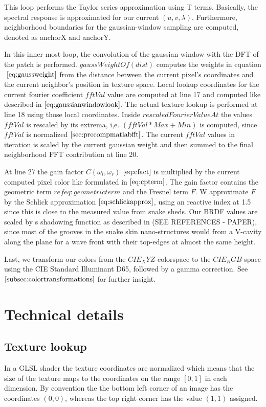 This loop performs the Taylor series approximation using T terms. Basically, the spectral response is approximated for our current $(u,v,\lambda)$. Furthermore, neighborhood boundaries for the gaussian-window sampling are computed, denoted as anchorX and anchorY.

In this inner most loop, the convolution of the gaussian window with the DFT of the patch is performed. $gaussWeightOf(dist)$ computes the weights in equation $~\eqref{eq:gaussweight}$ from the distance between the current pixel's coordinates and the current neighbor's position in texture space. Local lookup coordinates for the current fourier coefficient $fftVal$ value are computed at line 17 and computed like described in $\ref{eq:gaussianwindowlook}$. The actual texture lookup is performed at line 18 using those local coordinates. Inside $rescaledFourierValueAt$ the values $fftVal$ is rescaled by its extrema, i,e. $(fftVal*Max + Min)$ is computed, since $fftVal$ is normalized $\ref{sec:precompmatlabfft}$. The current $fftVal$ values in iteration is scaled by the current gaussian weight and then summed to the final neighborhood FFT contribution at line 20.

At line 27 the gain factor $C(\omega_i, \omega_r)$  $\ref{eq:cfact}$ is multiplied by the current computed pixel color like formulated in $\ref{eq:cpterm}$. The gain factor contains the geometric term $ref{eq:geometricterm}$ and the Fresnel term $F$. W approximate $F$ by the Schlick approximation $\ref{eq:schlickapprox}$, using an reactive index at 1.5 since this is close to the measured value from snake sheds.
Our BRDF values are scaled by s shadowing function as described in (SEE REFERENCES - PAPER), since most of the grooves in the snake skin nano-structures would from a V-cavity along the plane for a wave front with their top-edges at almost the same height.

Last, we transform our colors from the $CIE_XYZ$ colorspace to the $CIE_RGB$ space using the CIE Standard Illuminant D65, followed by a gamma correction. See $\ref{subsec:colortransformations}$ for further insight.

\section{Technical details}
\subsection{Texture lookup}
In a GLSL shader the texture coordinates are normalized which means that the size of the texture maps to the coordinates on the range $[0,1]$ in each dimension. By convention the the bottom left corner of an image has the coordinates $(0,0)$, whereas the top right corner has the value $(1,1)$ assigned. 


